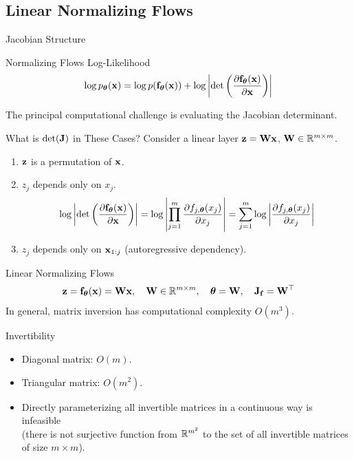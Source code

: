 \documentclass{beamer}
\renewcommand{\eqpause}{}
\renewcommand{\nextonslide}[1]{#1}
\begin{document}
\subsection{Linear Normalizing Flows}
\begin{frame}{Jacobian Structure}
	\begin{block}{Normalizing Flows Log-Likelihood}
		\[
			\log p_{\boldsymbol{\theta}}(\mathbf{x}) = \log p(\mathbf{f}_{\boldsymbol{\theta}}(\mathbf{x})) + \log \left|\det \left( \frac{\partial \mathbf{f}_{\boldsymbol{\theta}}(\mathbf{x})}{\partial \mathbf{x}} \right) \right|
		\]
	\end{block}
	The principal computational challenge is evaluating the Jacobian determinant.
    \eqpause
	\begin{block}{What is $\det(\mathbf{J})$ in These Cases?}
		Consider a linear layer $\mathbf{z} = \mathbf{W} \mathbf{x}$, $\mathbf{W} \in \mathbb{R}^{m \times m}$.
		\begin{enumerate}
			\item $\mathbf{z}$ is a permutation of $\mathbf{x}$.
			    \eqpause
			\item $z_j$ depends only on $x_j$. 
			\vspace{-0.3cm}
			\[
				\nextonslide{\log \left|\det \left( \frac{\partial \bff_{\btheta}(\bx)}{\partial \bx} \right) \right| = \log \left| \prod_{j=1}^m \frac{\partial f_{j, \btheta}(x_j)}{\partial x_j} \right| = \sum_{j=1}^m \log \left|  \frac{\partial f_{j, \btheta}(x_j)}{\partial x_j} \right|}
			\]
			\vspace{-0.3cm}
			\eqpause
			\item $z_j$ depends only on $\mathbf{x}_{1:j}$ (autoregressive dependency).
		\end{enumerate}
	\end{block}
\end{frame}
\begin{frame}{Linear Normalizing Flows}
	\[
		\mathbf{z} = \mathbf{f}_{\boldsymbol{\theta}}(\mathbf{x}) = \mathbf{W} \mathbf{x}, \quad \mathbf{W} \in \mathbb{R}^{m \times m}, \quad \boldsymbol{\theta} = \mathbf{W}, \quad \mathbf{J}_{\mathbf{f}} = \mathbf{W}^\top
	\]
	In general, matrix inversion has computational complexity $O(m^3)$.
    \eqpause
	\begin{block}{Invertibility}
		\begin{itemize}
			\item Diagonal matrix: $O(m)$.
			\item Triangular matrix: $O(m^2)$.
			\item Directly parameterizing all invertible matrices in a continuous way is infeasible \\ (there is not surjective function from $\mathbb{R}^{m^2}$ to the set of all invertible matrices of size $m \times m$).
		\end{itemize}
	\end{block}
\end{frame}
\end{document}
